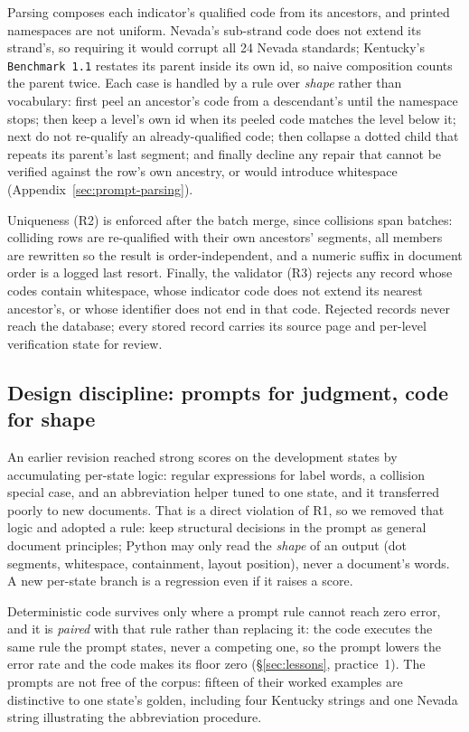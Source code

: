 \documentclass[letterpaper]{article} %
\begin{document}
Parsing composes each indicator's qualified code from its ancestors, and
printed namespaces are not uniform. Nevada's sub-strand code does not extend
its strand's, so requiring it would corrupt all 24 Nevada standards;
Kentucky's \texttt{Benchmark 1.1} restates its parent inside its own id, so
naive composition counts the parent twice. Each case is handled by a rule over
\emph{shape} rather than vocabulary: first peel an ancestor's code from a
descendant's until the namespace stops; then keep a level's own id when its
peeled code matches the level below it; next do not re-qualify an
already-qualified code; then collapse a dotted child that repeats its parent's
last segment; and finally decline any repair that cannot be verified against
the row's own ancestry, or would introduce whitespace
(Appendix~\ref{sec:prompt-parsing}).

Uniqueness (R2) is enforced after the batch merge, since collisions span
batches: colliding rows are re-qualified with their own ancestors' segments,
all members are rewritten so the result is order-independent, and a numeric
suffix in document order is a logged last resort. Finally, the validator (R3)
rejects any record whose codes contain whitespace, whose indicator code does
not extend its nearest ancestor's, or whose identifier does not end in that
code. Rejected records never reach the database; every stored record carries
its source page and per-level verification state for review.

\subsection{Design discipline: prompts for judgment, code for shape}
\label{sec:method-llm-first}

An earlier revision reached strong scores on the development states by
accumulating per-state logic: regular expressions for label words, a collision
special case, and an abbreviation helper tuned to one state, and it transferred
poorly to new documents. That is a direct violation of R1, so we removed that
logic and adopted a rule: keep structural decisions in the prompt as general
document principles; Python may only read the \emph{shape} of an output (dot
segments, whitespace, containment, layout position), never a document's words.
A new per-state branch is a regression even if it raises a score.

Deterministic code survives only where a prompt rule cannot reach zero error,
and it is \emph{paired} with that rule rather than replacing it: the code
executes the same rule the prompt states, never a competing one, so the prompt
lowers the error rate and the code makes its floor zero (\S\ref{sec:lessons},
practice~1). The prompts are not free of the corpus: fifteen of their worked
examples are distinctive to one state's golden, including four Kentucky
strings and one Nevada string illustrating the abbreviation procedure.
\end{document}
